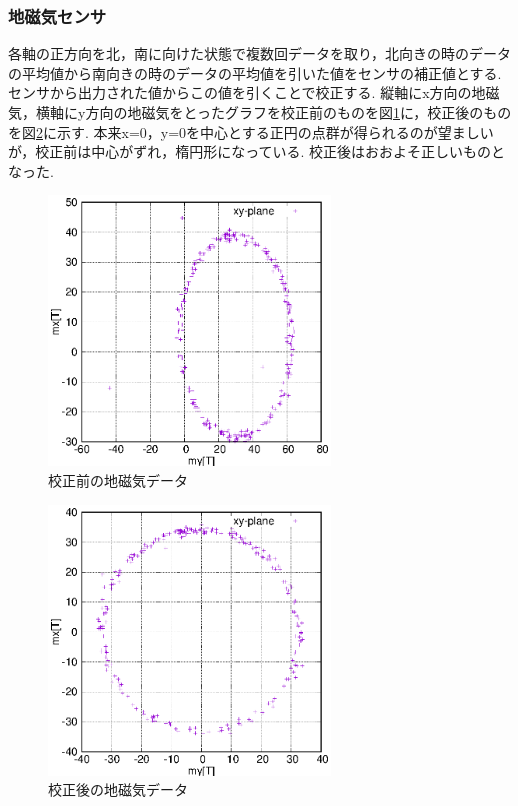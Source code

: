 \documentclass[12pt,oneside]{sotsuken_paper}
\begin{document}
\subsubsection{地磁気センサ}
各軸の正方向を北，南に向けた状態で複数回データを取り，北向きの時のデータの平均値から南向きの時のデータの平均値を引いた値をセンサの補正値とする.
センサから出力された値からこの値を引くことで校正する.
縦軸にx方向の地磁気，横軸にy方向の地磁気をとったグラフを校正前のものを図\ref{fig:mag-calib-be}に，校正後のものを図\ref{fig:mag-calib-af}に示す.
本来x=0，y=0を中心とする正円の点群が得られるのが望ましいが，校正前は中心がずれ，楕円形になっている.
校正後はおおよそ正しいものとなった.

\begin{figure}[htbp]
	\begin{center}
		\includegraphics[width=75mm]{image/calibration/mag-calib-be.eps}
		\caption{校正前の地磁気データ}
		\label{fig:mag-calib-be}
	\end{center}
\end{figure}

\begin{figure}[htbp]
	\begin{center}
		\includegraphics[width=75mm]{image/calibration/mag-calib-af.eps}
		\caption{校正後の地磁気データ}
		\label{fig:mag-calib-af}
	\end{center}
\end{figure}
\end{document}

